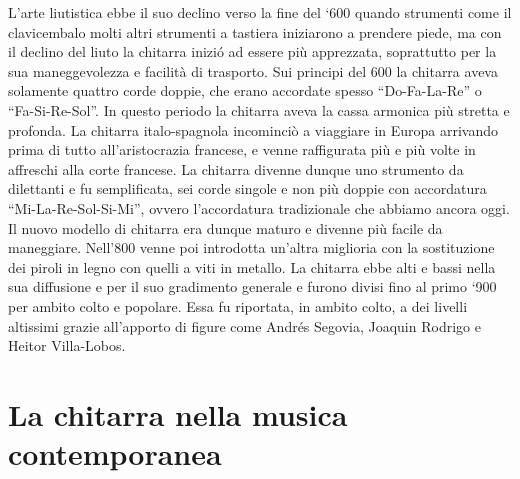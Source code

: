 \documentclass[oneside]{article}
\begin{document}
\begin{multicols*}{2}
L’arte liutistica ebbe il suo declino verso la fine del ‘600 quando strumenti come il clavicembalo molti altri strumenti a tastiera iniziarono a prendere piede, ma con il declino del liuto la  chitarra inizió ad essere più apprezzata, soprattutto per la sua maneggevolezza e facilità di trasporto.
Sui principi del 600 la chitarra aveva solamente quattro corde doppie, che erano accordate spesso  “Do-Fa-La-Re” o “Fa-Si-Re-Sol”. 
In questo periodo la chitarra aveva la cassa armonica più stretta e profonda.
La chitarra italo-spagnola incominciò a viaggiare in Europa arrivando prima di tutto all’aristocrazia francese, e venne raffigurata più e più volte in affreschi alla corte francese.
La chitarra divenne dunque uno strumento da dilettanti e fu semplificata, sei corde singole e non più doppie con accordatura “Mi-La-Re-Sol-Si-Mi”, ovvero l’accordatura tradizionale che abbiamo ancora oggi.
Il nuovo modello di chitarra era dunque maturo e divenne più facile da maneggiare. Nell’800 venne poi introdotta un’altra miglioria con la sostituzione dei piroli in legno con quelli a viti in metallo.
La chitarra ebbe alti e bassi nella sua diffusione e per il suo gradimento generale e furono divisi fino al  primo ‘900 per ambito colto e popolare.
Essa fu riportata, in ambito colto, a dei livelli altissimi grazie all’apporto di figure come Andrés Segovia, Joaquin Rodrigo e Heitor Villa-Lobos.



\section{ La chitarra nella musica contemporanea}


\end{multicols*}
\end{document}
